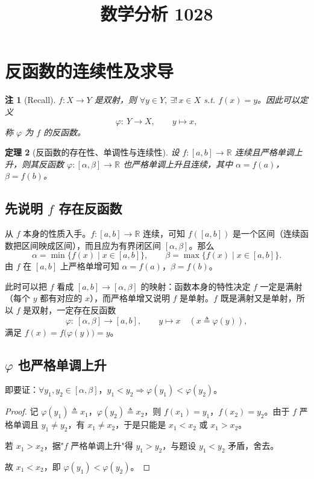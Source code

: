 \documentclass[UTF8,11pt]{ctexart}
\title{数学分析 1028}
\date{}
\theoremstyle{cnthm}
\newtheorem{thm}{定理}[section]
\newtheorem{rem}[thm]{注}
\begin{document}
\maketitle

\section{反函数的连续性及求导}

\begin{rem}[Recall]
$f:X\to Y$ 是双射，则 $\forall y\in Y,\ \exists!\,x\in X$ s.t. $f(x)=y$。因此可以定义
\[
\varphi:\ Y\to X,\qquad y\longmapsto x ,
\]
称 $\varphi$ 为 $f$ 的反函数。
\end{rem}

\begin{thm}[反函数的存在性、单调性与连续性]
设 $f:[a,b]\to\mathbb{R}$ 连续且严格单调上升，则其反函数 $\varphi:[\alpha,\beta]\to\mathbb{R}$ 也严格单调上升且连续，其中 $\alpha=f(a)$，$\beta=f(b)$。
\end{thm}

\subsection{先说明 $f$ 存在反函数}

从 $f$ 本身的性质入手。$f:[a,b]\to\mathbb{R}$ 连续，可知 $f([a,b])$ 是一个区间（连续函数把区间映成区间），而且应为有界闭区间 $[\alpha,\beta]$。那么
\[
\alpha=\min\{f(x)\mid x\in[a,b]\},\qquad \beta=\max\{f(x)\mid x\in[a,b]\}.
\]
由 $f$ 在 $[a,b]$ 上严格单增可知 $\alpha=f(a)$，$\beta=f(b)$。

此时可以把 $f$ 看成 $[a,b]\to[\alpha,\beta]$ 的映射：函数本身的特性决定 $f$ 一定是满射（每个 $y$ 都有对应的 $x$），而严格单增又说明 $f$ 是单射。$f$ 既是满射又是单射，所以 $f$ 是双射，一定存在反函数
\[
\varphi:\ [\alpha,\beta]\to[a,b],\qquad y\longmapsto x\quad(x\triangleq\varphi(y)),
\]
满足 $f(x)=f\bigl(\varphi(y)\bigr)=y$。

\subsection{$\varphi$ 也严格单调上升}

即要证：$\forall y_1,y_2\in[\alpha,\beta]$，$y_1<y_2\Rightarrow\varphi(y_1)<\varphi(y_2)$。

\begin{proof}
记 $\varphi(y_1)\triangleq x_1$，$\varphi(y_2)\triangleq x_2$，则 $f(x_1)=y_1$，$f(x_2)=y_2$。由于 $f$ 严格单调且 $y_1\neq y_2$，有 $x_1\neq x_2$，于是只能是 $x_1<x_2$ 或 $x_1>x_2$。

若 $x_1>x_2$，据"$f$ 严格单调上升"得 $y_1>y_2$，与题设 $y_1<y_2$ 矛盾，舍去。

故 $x_1<x_2$，即 $\varphi(y_1)<\varphi(y_2)$。
\end{proof}
\end{document}
